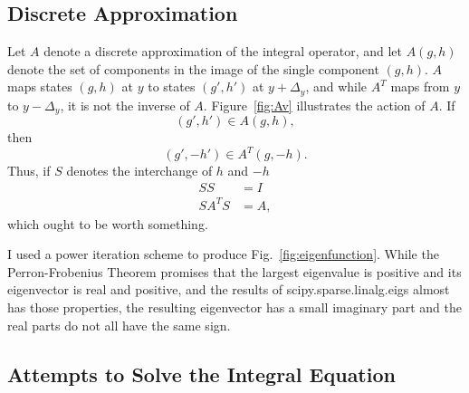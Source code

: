 \documentclass[]{article}
\begin{document}
\subsection{Discrete Approximation}
\label{sec:approximate}

Let $A$ denote a discrete approximation of the integral operator, and
let $A(g,h)$ denote the set of components in the image of the single
component $(g,h)$.  $A$ maps states $(g,h)$ at $y$ to states $(g',h')$
at $y+\Delta_y$, and while $A^T$ maps from $y$ to $y-\Delta_y$, it is
not the inverse of $A$.  Figure~\ref{fig:Av} illustrates the action of
$A$.  If
\begin{equation*}
  (g',h') \in A(g,h),
\end{equation*}
then
\begin{equation*}
  (g', -h') \in A^T(g,-h).
\end{equation*}
Thus, if $S$ denotes the interchange of $h$ and $-h$
\begin{align*}
  SS &= I \\
  SA^TS &= A,
\end{align*}
which ought to be worth something.

\begin{figure*}
  \centering
  \caption{Action of integral operator and its transpose on selected points}
  \label{fig:Av}
\end{figure*}

I used a power iteration scheme to produce
Fig.~\ref{fig:eigenfunction}.  While the Perron-Frobenius Theorem
promises that the largest eigenvalue is positive and its eigenvector
is real and positive, and the results of scipy.sparse.linalg.eigs
almost has those properties, the resulting eigenvector has a small
imaginary part and the real parts do not all have the same sign.
\begin{figure*}
  \centering
  \caption{Eigenfunction of integral operator.}
  \label{fig:eigenfunction}
\end{figure*}

\subsection{Attempts to Solve the Integral Equation}
\label{sec:solve}
\end{document}
